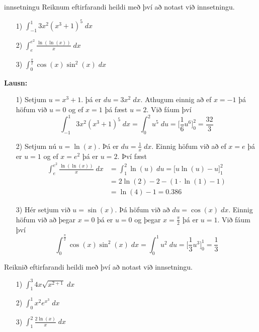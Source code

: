 \begin{syn}{innsetningu}
Reiknum eftirfarandi heildi með því að notast við innsetningu.
\begin{itemize}
\item[1)] $\displaystyle \int_{-1}^{1} 3x^{2}\left(x^{3}+1\right)^{5} \; dx$

\item[2)] $\displaystyle \int_{e}^{e^{2}} \frac{\ln(\ln(x))}{x}  \; dx$

\item[3)] $\displaystyle \int_{0}^{\frac{\pi}{2}} \cos(x)\sin^{2}(x) \; dx$
\end{itemize}

\vspace{2mm}

{\bf Lausn:}
\begin{itemize}
\item[1)] Setjum $u = x^{3}+1$. þá er $du = 3x^{2} \; dx$. Athugum einnig að ef $x = -1$ þá höfum við $u = 0$ og ef $x = 1$ þá fæst $u = 2$. Við fáum því
$$
\int_{-1}^{1} 3x^{2}\left(x^{3}+1\right)^{5} \; dx = \int_{0}^{2} u^{5} \; du = \Biggl[\frac{1}{6}u^{6}\Biggr]_{0}^{2} = \frac{32}{3}
$$

\item[2)] Setjum nú $u = \ln(x)$. Þá er $du = \frac{1}{x}\; dx$. Einnig höfum við að ef $x = e$ þá er $u = 1$ og ef $x = e^{2}$ þá er $u = 2$. Því fæst
\setlength{\jot}{4mm}
\begin{align*}
\int_{e}^{e^{2}} \frac{\ln(\ln(x))}{x}  \; dx &= \int_{1}^{2} \ln(u) \; du = \Biggl[u\ln(u)-u\Biggr]_{1}^{2}\\ &= 2\ln(2)-2-\left(1\cdot\ln(1)-1\right)\\ &= \ln(4)-1 = 0.386
\end{align*}

\item[3)] Hér setjum við $u = \sin(x)$. Þá höfum við að $du = \cos(x) \; dx$. Einnig höfum við að þegar $x = 0$ þá er $u = 0$ og þegar $x = \frac{\pi}{2}$ þá er $u = 1$. Við fáum því
$$
\int_{0}^{\frac{\pi}{2}} \cos(x)\sin^{2}(x) \; dx = \int_{0}^{1} u^{2} \; du = \Biggl[\frac{1}{3}u^{3}\Biggr]_{0}^{1} = \frac{1}{3}
$$
\end{itemize}
\end{syn}

\begin{æd}
Reiknið eftirfarandi heildi með því að notast við innsetningu.
\begin{itemize}
\item[1)] $\displaystyle \int_{1}^{3} 4x\sqrt{x^{2+1}} \; dx$

\item[2)] $\displaystyle \int_{0}^{1} x^{2}e^{x^{3}} \; dx$

\item[3)] $\displaystyle \int_{1}^{2} \frac{2\ln(x)}{x}\; dx$
\end{itemize}
\end{æd}

